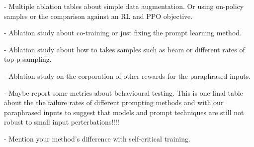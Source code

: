 \documentclass[11pt]{article}
\begin{document}
- Multiple ablation tables about simple data augmentation. Or using on-policy samples or the comparison against an RL and PPO objective.

- Ablation study about co-training or just fixing the prompt learning method.

- Ablation study about how to takes samples such as beam or different rates of top-p sampling.

- Ablation study on the corporation of other rewards for the paraphrased inputs.

- Maybe report some metrics about behavioural testing.
    This is one final table about the the failure rates of different prompting methods and with our paraphrased inputs to suggest that models and prompt techniques are still not robust to small input perterbations!!!!

- Mention your method's difference with self-critical training.
\end{document}
